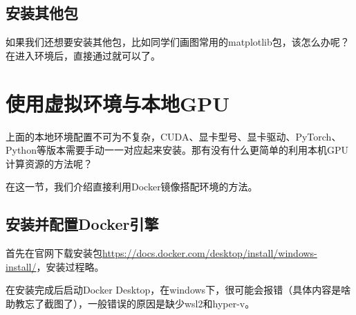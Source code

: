 \subsection{安装其他包}

如果我们还想要安装其他包，比如同学们画图常用的matplotlib包，该怎么办呢？在进入环境后，直接通过就可以了。




\section{使用虚拟环境与本地GPU}\label{sec:env-setup-docker}

上面的本地环境配置不可为不复杂，CUDA、显卡型号、显卡驱动、PyTorch、Python等版本需要手动一一对应起来安装。那有没有什么更简单的利用本机GPU计算资源的方法呢？

在这一节，我们介绍直接利用Docker镜像搭配环境的方法。

\subsection{安装并配置Docker引擎}

首先在官网下载安装包\url{https://docs.docker.com/desktop/install/windows-install/}，安装过程略。

在安装完成后启动Docker Desktop，在windows下，很可能会报错（具体内容是啥助教忘了截图了），一般错误的原因是缺少wsl2和hyper-v。

